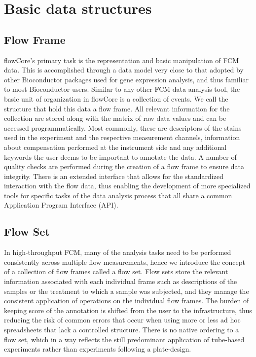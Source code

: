\documentclass[12pt]{article}
\begin{document}
\section*{Basic data structures}
\subsection*{Flow Frame}
flowCore's primary task is the representation and basic manipulation
of FCM data. This is accomplished through a data model very
close to that adopted by other Bioconductor packages used for gene
expression analysis, and thus familiar to most Bioconductor
users. Similar to any other FCM data analysis tool, the basic unit of organization
in flowCore is a collection of events. We call the structure that hold
this data a flow frame. All relevant information for the collection
are stored along with the matrix of raw data values and can be
accessed programmatically. Most commonly, these are descriptors of the
stains used in the experiment and the respective measurement channels,
information about compensation performed at the instrument side and
any additional keywords the user deems to be important to annotate the
data. A number of quality checks are performed during the creation of
a flow frame to ensure data integrity. There is an extended interface
that allows for the standardized interaction with the flow data, thus
enabling the development of more specialized tools for specific tasks
of the data analysis process that all share a common Application Program Interface (API).

\subsection*{Flow Set}
In high-throughput FCM, many of the analysis tasks need to be
performed consistently across multiple flow measurements, hence we
introduce the concept of a collection of flow frames called a flow
set. Flow sets store the relevant information associated with each
individual frame such as descriptions of the samples or the treatment
to which a sample was subjected, and they manage the consistent
application of operations on the individual flow frames. The burden of
keeping score of the annotation is shifted from the user to the
infrastructure, thus reducing the risk of common errors %
that occur when using more or less ad hoc spreadsheets that
lack a controlled structure. There is no native ordering
to a flow set, which in a way reflects the still predominant
application of tube-based experiments rather than experiments
following a plate-design. 
\end{document}
